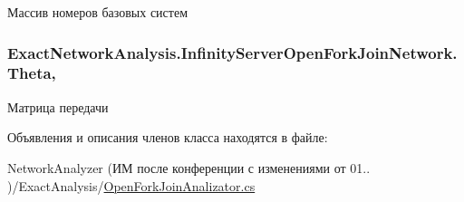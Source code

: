 Массив номеров базовых систем 

\subsubsection[{\texorpdfstring{Theta}{Theta}}]{ Exact\+Network\+Analysis.\+Infinity\+Server\+Open\+Fork\+Join\+Network.\+Theta\hspace{0.3cm}{\ttfamily [get]}, {\ttfamily [set]}}\hypertarget{class_exact_network_analysis_1_1_infinity_server_open_fork_join_network_a1b837b250c20167a9ac7391fc6bd714e}{}\label{class_exact_network_analysis_1_1_infinity_server_open_fork_join_network_a1b837b250c20167a9ac7391fc6bd714e}


Матрица передачи 



Объявления и описания членов класса находятся в файле\+:\begin{DoxyCompactItemize}
\item 
Network\+Analyzer (ИМ после конференции  с изменениями от 01.. )/\+Exact\+Analysis/\hyperlink{_open_fork_join_analizator_8cs}{Open\+Fork\+Join\+Analizator.\+cs}\end{DoxyCompactItemize}
